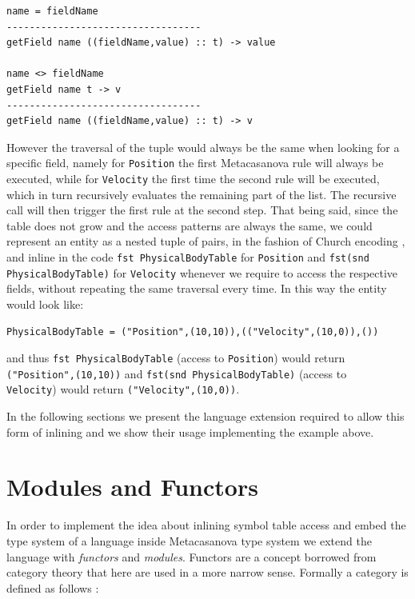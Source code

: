 \begin{lstlisting}
name = fieldName
----------------------------------
getField name ((fieldName,value) :: t) -> value

name <> fieldName
getField name t -> v
----------------------------------
getField name ((fieldName,value) :: t) -> v
\end{lstlisting}

\noindent
However the traversal of the tuple would always be the same when looking for a specific field, namely for \texttt{Position} the first Metacasanova rule will always be executed, while for \texttt{Velocity} the first time the second rule will be executed, which in turn recursively evaluates the remaining part of the list. The recursive call will then trigger the first rule at the second step. That being said, since the table does not grow and the access patterns are always the same, we could represent an entity as a nested tuple of pairs, in the fashion of Church encoding \cite{kleene1935theory, pierce2002types}, and inline in the code \texttt{fst PhysicalBodyTable} for \texttt{Position} and \texttt{fst(snd PhysicalBodyTable)} for \texttt{Velocity} whenever we require to access the respective fields, without repeating the same traversal every time. In this way the entity would look like:

\begin{lstlisting}
PhysicalBodyTable = ("Position",(10,10)),(("Velocity",(10,0)),())
\end{lstlisting}

\noindent
and thus \texttt{fst PhysicalBodyTable} (access to \texttt{Position}) would return\\ \texttt{("Position",(10,10))} and \texttt{fst(snd PhysicalBodyTable)} (access to\\ \texttt{Velocity}) would return \texttt{("Velocity",(10,0))}.

In the following sections we present the language extension required to allow this form of inlining and we show their usage implementing the example above.

\section{Modules and Functors}
\label{sec:ch_functors_modules_functors}
In order to implement the idea about inlining symbol table access and embed the type system of a language inside Metacasanova type system we extend the language with \textit{functors} and \textit{modules}. Functors are a concept borrowed from category theory that here are used in a more narrow sense. Formally a category is defined as follows \cite{asperti1991categories, mitchell1965theory, pierce1991basic}:

